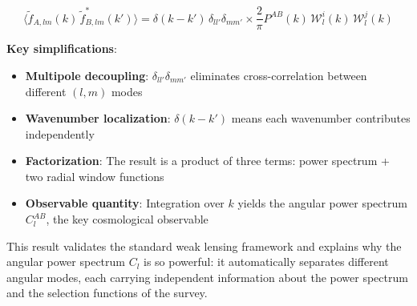 \begin{equation}
    \boxed{\langle \tilde{f}_{A,lm}(k) \, \tilde{f}_{B,lm}^*(k') \rangle = \delta(k - k') \, \delta_{ll'} \delta_{mm'} \times \frac{2}{\pi} P^{AB}(k) \, \mathcal{W}_l^i(k) \, \mathcal{W}_l^j(k)}
\label{eq:isotropic_final_result}
\end{equation}

\textbf{Key simplifications}:
\begin{itemize}
    \item \textbf{Multipole decoupling}: $\delta_{ll'} \delta_{mm'}$ eliminates cross-correlation between different $(l,m)$ modes
    \item \textbf{Wavenumber localization}: $\delta(k - k')$ means each wavenumber contributes independently
    \item \textbf{Factorization}: The result is a product of three terms: power spectrum + two radial window functions
    \item \textbf{Observable quantity}: Integration over $k$ yields the angular power spectrum $C_l^{AB}$, the key cosmological observable
\end{itemize}

This result validates the standard weak lensing framework and explains why the angular power spectrum $C_l$ is so powerful: it automatically separates different angular modes, each carrying independent information about the power spectrum and the selection functions of the survey.



